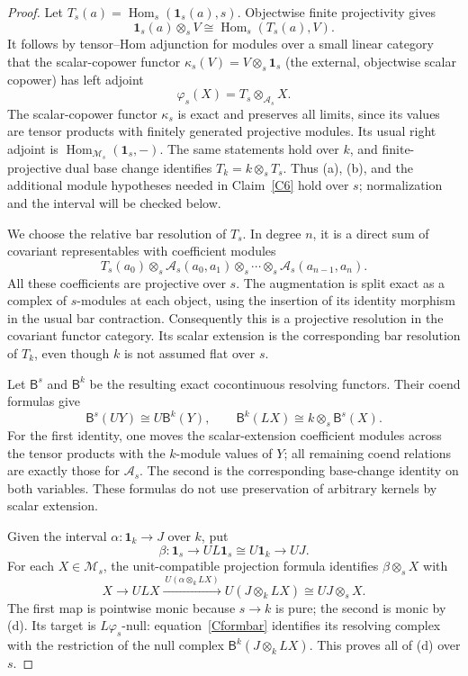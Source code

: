 \begin{proof}
Let $T_s(a)=\operatorname{Hom}_s(\mathbf1_s(a),s)$. Objectwise finite projectivity gives
\[
 \mathbf1_s(a)\otimes_sV\cong\operatorname{Hom}_s(T_s(a),V).
\]
It follows by tensor--Hom adjunction for modules over a small linear category that the scalar-copower functor $\kappa_s(V)=V\otimes_s\mathbf1_s$ (the external, objectwise scalar copower) has left adjoint
\[
 \varphi_s(X)=T_s\otimes_{\mathcal A_s}X.
\]
The scalar-copower functor $\kappa_s$ is exact and preserves all limits, since its values are tensor products with finitely generated projective modules. Its usual right adjoint is $\operatorname{Hom}_{\mathcal M_s}(\mathbf1_s,-)$. The same statements hold over $k$, and finite-projective dual base change identifies $T_k=k\otimes_sT_s$. Thus (a), (b), and the additional module hypotheses needed in Claim~\ref{C6} hold over $s$; normalization and the interval will be checked below.

We choose the relative bar resolution of $T_s$. In degree $n$, it is a direct sum of covariant representables with coefficient modules
\[
 T_s(a_0)\otimes_s\mathcal A_s(a_0,a_1)
 \otimes_s\cdots\otimes_s\mathcal A_s(a_{n-1},a_n).
\]
All these coefficients are projective over $s$. The augmentation is split exact as a complex of $s$-modules at each object, using the insertion of its identity morphism in the usual bar contraction. Consequently this is a projective resolution in the covariant functor category. Its scalar extension is the corresponding bar resolution of $T_k$, even though $k$ is not assumed flat over $s$.

Let $\mathsf B^s$ and $\mathsf B^k$ be the resulting exact cocontinuous resolving functors. Their coend formulas give
\[
 \mathsf B^s(UY)\cong U\mathsf B^k(Y),
 \qquad
 \mathsf B^k(LX)\cong k\otimes_s\mathsf B^s(X).
 \tag{C-form-bar}\label{Cformbar}
\]
For the first identity, one moves the scalar-extension coefficient modules across the tensor products with the $k$-module values of $Y$; all remaining coend relations are exactly those for $\mathcal A_s$. The second is the corresponding base-change identity on both variables. These formulas do not use preservation of arbitrary kernels by scalar extension.

Given the interval $\alpha:\mathbf1_k\to J$ over $k$, put
\[
 \beta:\mathbf1_s\longrightarrow UL\mathbf1_s
 \cong U\mathbf1_k\longrightarrow UJ.
\]
For each $X\in\mathcal M_s$, the unit-compatible projection formula identifies $\beta\otimes_sX$ with
\[
 X\longrightarrow ULX
 \xrightarrow{\ U(\alpha\otimes_k LX)\ }
 U(J\otimes_k LX)\cong UJ\otimes_sX.
\]
The first map is pointwise monic because $s\to k$ is pure; the second is monic by (d). Its target is $L\varphi_s$-null: equation~\eqref{Cformbar} identifies its resolving complex with the restriction of the null complex $\mathsf B^k(J\otimes_kLX)$. This proves all of (d) over $s$.


\end{proof}
